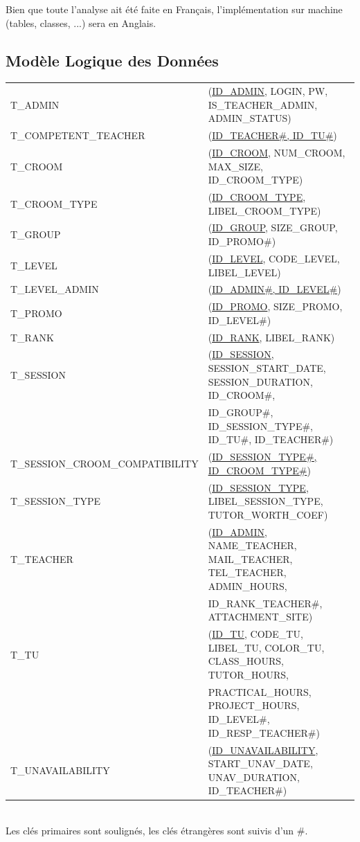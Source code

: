 \documentclass{article}
\begin{document}
Bien que toute l'analyse ait été faite en Français, l'implémentation sur machine (tables, classes, ...) sera en Anglais.

\subsection{Modèle Logique des Données}

{\ttfamily
\begin{tabular}{l l}
T\_ADMIN & (\underline{ID\_ADMIN}, LOGIN, PW, IS\_TEACHER\_ADMIN, ADMIN\_STATUS) \\
T\_COMPETENT\_TEACHER & (\underline{ID\_TEACHER\#, ID\_TU\#}) \\
T\_CROOM & (\underline{ID\_CROOM}, NUM\_CROOM, MAX\_SIZE, ID\_CROOM\_TYPE) \\
T\_CROOM\_TYPE & (\underline{ID\_CROOM\_TYPE}, LIBEL\_CROOM\_TYPE) \\
T\_GROUP & (\underline{ID\_GROUP}, SIZE\_GROUP, ID\_PROMO\#) \\
T\_LEVEL & (\underline{ID\_LEVEL}, CODE\_LEVEL, LIBEL\_LEVEL) \\
T\_LEVEL\_ADMIN & (\underline{ID\_ADMIN\#, ID\_LEVEL\#}) \\
T\_PROMO & (\underline{ID\_PROMO}, SIZE\_PROMO, ID\_LEVEL\#) \\
T\_RANK & (\underline{ID\_RANK}, LIBEL\_RANK) \\
T\_SESSION & (\underline{ID\_SESSION}, SESSION\_START\_DATE, SESSION\_DURATION, ID\_CROOM\#, \\
           &  ID\_GROUP\#, ID\_SESSION\_TYPE\#, ID\_TU\#, ID\_TEACHER\#) \\
T\_SESSION\_CROOM\_COMPATIBILITY & (\underline{ID\_SESSION\_TYPE\#, ID\_CROOM\_TYPE\#}) \\
T\_SESSION\_TYPE & (\underline{ID\_SESSION\_TYPE}, LIBEL\_SESSION\_TYPE, TUTOR\_WORTH\_COEF) \\
T\_TEACHER & (\underline{ID\_ADMIN}, NAME\_TEACHER, MAIL\_TEACHER, TEL\_TEACHER, ADMIN\_HOURS, \\
          &  ID\_RANK\_TEACHER\#, ATTACHMENT\_SITE) \\
T\_TU & (\underline{ID\_TU}, CODE\_TU, LIBEL\_TU, COLOR\_TU, CLASS\_HOURS, TUTOR\_HOURS, \\
     &  PRACTICAL\_HOURS, PROJECT\_HOURS, ID\_LEVEL\#, ID\_RESP\_TEACHER\#) \\
T\_UNAVAILABILITY & (\underline{ID\_UNAVAILABILITY}, START\_UNAV\_DATE, UNAV\_DURATION, ID\_TEACHER\#) \\
\end{tabular}}\\
Les clés primaires sont soulignés, les clés étrangères sont suivis d'un {\ttfamily \#}.
\end{document}
